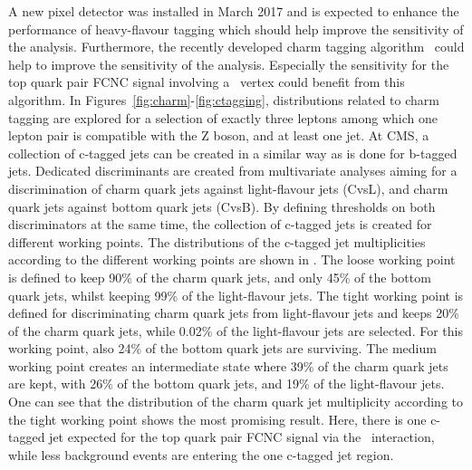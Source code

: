 A new pixel detector was installed in March 2017 and is expected to enhance the performance of heavy-flavour tagging which should help improve the sensitivity of the analysis. Furthermore, the recently developed charm tagging algorithm~\cite{CMS-PAS-BTV-16-001} could help to improve the sensitivity of the analysis.  Especially  the sensitivity for the top quark pair FCNC signal involving a \Zct\ vertex could benefit from this algorithm. In Figures~\ref{fig:charm}-\ref{fig:ctagging},  distributions related to charm tagging are explored for a selection of exactly three leptons among which one lepton pair is compatible with the Z boson, and at least one jet. At CMS, a collection of c-tagged jets can be created in a similar way as is done for b-tagged jets. Dedicated discriminants are created from multivariate analyses aiming for a discrimination of charm quark jets against light-flavour jets (CvsL),  and charm quark jets against bottom quark jets (CvsB). By defining thresholds on both discriminators at the same time, the collection of c-tagged jets is created for different working points. The distributions of the c-tagged jet multiplicities according to the different working points are shown in . The loose working point is defined to keep 90\% of the charm quark jets, and only 45\% of the bottom quark jets, whilst keeping 99\% of the light-flavour jets. The tight working point is defined for discriminating charm quark jets from light-flavour jets and keeps 20\% of the charm quark jets, while 0.02\% of the light-flavour jets are selected. For this working point, also 24\% of the bottom quark jets are surviving. The medium working point creates an intermediate state where 39\% of the charm quark jets are kept, with 26\% of the bottom quark jets, and 19\% of the light-flavour jets. One can see that the distribution of the charm quark jet multiplicity according to the tight working point shows the most promising result. Here, there is one c-tagged jet expected for the top quark pair FCNC signal via the \Zct\ interaction, while less background events are entering the one c-tagged jet region.


